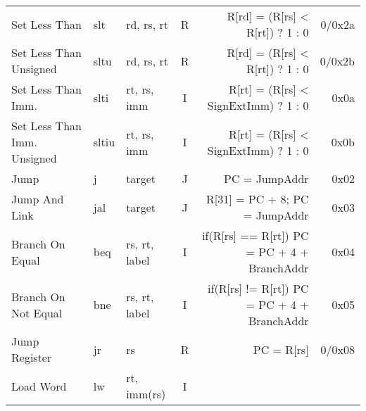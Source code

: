\begin{tabularx}{\textwidth}{lMAcDr}
    \midrule
    Set Less Than                                                                   & slt    & rd, rs, rt    & R &
    R[rd] = (R[rs] < R[rt]) ? 1 : 0                                                 & 0/0x2a                       \\
    Set Less Than Unsigned                                                          & sltu   & rd, rs, rt    & R &
    R[rd] = (R[rs] < R[rt]) ? 1 : 0                \footnotemark[6]                 & 0/0x2b                       \\
    Set Less Than Imm.                                                              & slti   & rt, rs, imm   & I &
    R[rt] = (R[rs] < SignExtImm) ? 1 : 0           \footnotemark[2]                 & 0x0a                         \\
    Set Less Than Imm. Unsigned                                                     & sltiu  & rt, rs, imm   & I &
    R[rt] = (R[rs] < SignExtImm) ? 1 : 0           \footnotemark[2]\footnotemark[6] & 0x0b                         \\
    \midrule
    Jump                                                                            & j      & target        & J &
    PC = JumpAddr                                  \footnotemark[5]                 & 0x02                         \\
    Jump And Link                                                                   & jal    & target        & J &
    R[31] = PC + 8; PC = JumpAddr                  \footnotemark[5]                 & 0x03                         \\
    Branch On Equal                                                                 & beq    & rs, rt, label & I &
    if(R[rs] == R[rt]) PC = PC + 4 + BranchAddr    \footnotemark[4]                 & 0x04                         \\
    Branch On Not Equal                                                             & bne    & rs, rt, label & I &
    if(R[rs] != R[rt]) PC = PC + 4 + BranchAddr    \footnotemark[4]                 & 0x05                         \\
    Jump Register                                                                   & jr     & rs            & R &
    PC = R[rs]                                                                      & 0/0x08                       \\
    \midrule
    Load Word                                                                       & lw     & rt, imm(rs)   & I &

\end{tabularx}
